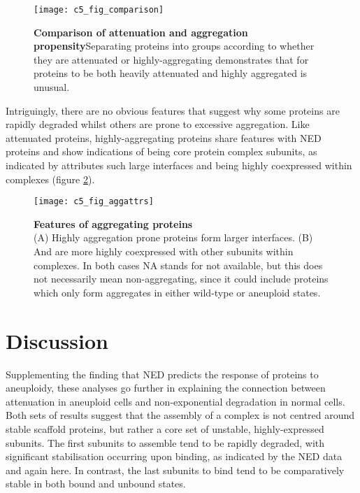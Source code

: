 \documentclass[a4paper,11pt,twoside,openright]{scrbook}
\begin{document}
\begin{figure}[h]
\fcapsideright
    {\caption[Comparison of attenuation and aggregation propensity]{\sffamily\textbf{Comparison of attenuation and aggregation propensity}\newline \small Separating proteins into groups according to whether they are attenuated or highly-aggregating demonstrates that for proteins to be both heavily attenuated and highly aggregated is unusual.}\label{figure:aneuploidy_comparison}}
    {\texttt{[image: c5\_fig\_comparison]}}
\end{figure}

Intriguingly, there are no obvious features that suggest why some proteins are rapidly degraded whilst others are prone to excessive aggregation. Like attenuated proteins, highly-aggregating proteins share features with NED proteins and show indications of being core protein complex subunits, as indicated by attributes such large interfaces and being highly coexpressed within complexes (figure \ref{figure:aneuploidy_aggattrs}).

\begin{figure}[h]
    \texttt{[image: c5\_fig\_aggattrs]}
    \caption[Features of aggregating proteins]{\sffamily \textbf{Features of aggregating proteins} \\ \small (A) Highly aggregation prone proteins form larger interfaces. (B) And are more highly coexpressed with other subunits within complexes. In both cases NA stands for not available, but this does not necessarily mean non-aggregating, since it could include proteins which only form aggregates in either wild-type or aneuploid states.}
    \label{figure:aneuploidy_aggattrs}
\end{figure}


\section{Discussion}
Supplementing the finding that NED predicts the response of proteins to aneuploidy, these analyses go further in explaining the connection between attenuation in aneuploid cells and non-exponential degradation in normal cells. Both sets of results suggest that the assembly of a complex is not centred around stable scaffold proteins, but rather a core set of unstable, highly-expressed subunits. The first subunits to assemble tend to be rapidly degraded, with significant stabilisation occurring upon binding, as indicated by the NED data and again here. In contrast, the last subunits to bind tend to be comparatively stable in both bound and unbound states.
\end{document}
